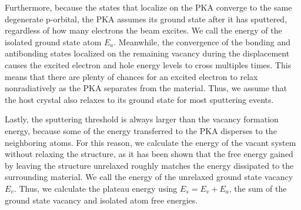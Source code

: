 \documentclass{article}
\begin{document}
Furthermore, because the states that localize on the PKA converge to the same
degenerate p-orbital, the PKA assumes its ground state after it has sputtered,
regardless of how many electrons the beam excites.
We call the energy of the isolated ground state atom $E_a$.
Meanwhile, the convergence of the bonding and antibonding states localized on
the remaining vacancy during the displacement causes the excited electron and
hole energy levels to cross multiples times.
This means that there are plenty of chances for an excited electron to relax
nonradiatively as the PKA separates from the material.
Thus, we assume that the host crystal also relaxes to its ground state for most
sputtering events.

Lastly, the sputtering threshold is always larger than the vacancy formation
energy, because some of the energy transferred to the PKA disperses to the
neighboring atoms.
For this reason, we calculate the energy of the vacant system without relaxing
the structure, as it has been shown that the free energy gained by leaving the
structure unrelaxed roughly matches the energy dissipated to the
surrounding material.\cite{Komsa2012}
We call the energy of the unrelaxed ground state vacancy $E_v$.
Thus, we calculate the plateau energy using $E_s = E_v + E_a$, the sum of the
ground state vacancy and isolated atom free energies.
\end{document}
